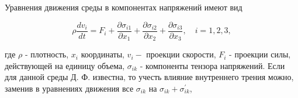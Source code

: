 \documentclass[10pt]{article}
\begin{document}
Уравнения движения среды в компонентах напряжений имеют вид



\[

\rho \frac{d v_{i}}{d t}=F_{i}+\frac{\partial \sigma_{i 1}}{\partial x_{1}}+\frac{\partial \sigma_{i 2}}{\partial x_{2}}+\frac{\partial \sigma_{i 3}}{\partial x_{3}}, \quad i=1,2,3,

\]



где $\rho$ - плотность, $x_{i}$ координаты, $v_{i}-$ проекции скорости, $F_{i}$ - проекции силы, действующей на единицу объема, $\sigma_{i k}$ - компоненты тензора напряжений. Если для данной среды Д. Ф. известна, то учесть влияние внутреннего трения можно, заменив в уравнениях движения все $\sigma_{i k}$ на $\sigma_{i k}+\sigma_{i k}^{\prime}$,
\end{document}
